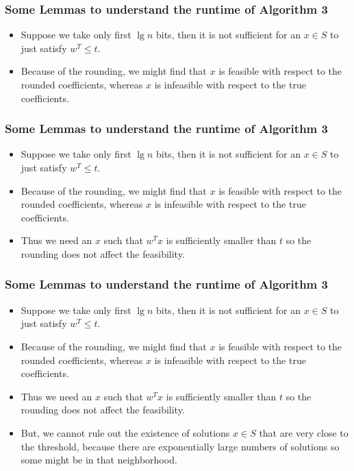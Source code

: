 \begin{frame}
    \frametitle{Some Lemmas to understand the runtime of Algorithm 3}

    \begin{itemize}
        \item Suppose we take only first $\lg n$ bits, then it is not sufficient for an $x
                  \in S$ to just satisfy $w^T \leq t$.
        \item Because of the rounding, we might find that $x$ is feasible with respect to the
              rounded coefficients, whereas $x$ is infeasible with respect to the true
              coefficients.
    \end{itemize}

\end{frame}

\begin{frame}
    \frametitle{Some Lemmas to understand the runtime of Algorithm 3}

    \begin{itemize}
        \item Suppose we take only first $\lg n$ bits, then it is not sufficient for an $x
                  \in S$ to just satisfy $w^T \leq t$.
        \item Because of the rounding, we might find that $x$ is feasible with respect to the
              rounded coefficients, whereas $x$ is infeasible with respect to the true
              coefficients.
        \item Thus we need an $x$ such that $w^T x$ is sufficiently smaller than $t$ so the
              rounding does not affect the feasibility.
    \end{itemize}

\end{frame}

\begin{frame}
    \frametitle{Some Lemmas to understand the runtime of Algorithm 3}

    \begin{itemize}
        \item Suppose we take only first $\lg n$ bits, then it is not sufficient for an $x
                  \in S$ to just satisfy $w^T \leq t$.
        \item Because of the rounding, we might find that $x$ is feasible with respect to the
              rounded coefficients, whereas $x$ is infeasible with respect to the true
              coefficients.
        \item Thus we need an $x$ such that $w^T x$ is sufficiently smaller than $t$ so the
              rounding does not affect the feasibility.
        \item But, we cannot rule out the existence of solutions $x \in S$ that are very
              close to the threshold, because there are exponentially large numbers of
              solutions so some might be in that neighborhood.
    \end{itemize}

\end{frame}

